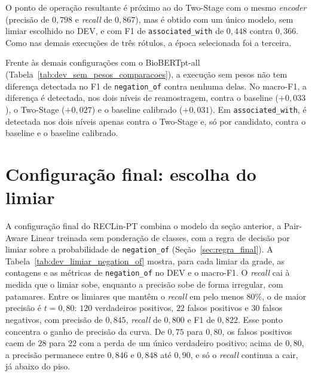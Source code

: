 O ponto de operação resultante é próximo ao do Two-Stage com o mesmo \emph{encoder}
(precisão de $0{,}798$ e \emph{recall} de $0{,}867$), mas é obtido com um único
modelo, sem limiar escolhido no DEV, e com F1 de \texttt{associated\_with} de
$0{,}448$ contra $0{,}366$. Como nas demais execuções de três rótulos, a época
selecionada foi a terceira.



Frente às demais configurações com o BioBERTpt-all
(Tabela~\ref{tab:dev_sem_pesos_comparacoes}), a execução sem pesos não tem diferença
detectada no F1 de \texttt{negation\_of} contra nenhuma delas. No macro-F1, a
diferença é detectada, nos dois níveis de reamostragem, contra o baseline
($+0{,}033$), o Two-Stage ($+0{,}027$) e o baseline calibrado ($+0{,}031$). Em
\texttt{associated\_with}, é detectada nos dois níveis apenas contra o Two-Stage e,
só por candidato, contra o baseline e o baseline calibrado.

\section{Configuração final: escolha do limiar}
\label{sec:resultados_configuracao_final}

A configuração final do RECLin-PT combina o modelo da seção anterior, a Pair-Aware
Linear treinada sem ponderação de classes, com a regra de decisão por limiar sobre
a probabilidade de \texttt{negation\_of} (Seção~\ref{sec:regra_final}). A
Tabela~\ref{tab:dev_limiar_negation_of} mostra, para cada limiar da grade, as
contagens e as métricas de \texttt{negation\_of} no DEV e o macro-F1. O
\emph{recall} cai à medida que o limiar sobe, enquanto a precisão sobe de forma
irregular, com patamares. Entre os limiares que mantêm o \emph{recall} em pelo menos
$80\%$, o de maior precisão é $t=0{,}80$: $120$ verdadeiros positivos, $22$ falsos
positivos e $30$ falsos negativos, com precisão de $0{,}845$, \emph{recall} de
$0{,}800$ e F1 de $0{,}822$. Esse ponto concentra o ganho de precisão da curva. De
$0{,}75$ para $0{,}80$, os falsos positivos caem de $28$ para $22$ com a perda de um
único verdadeiro positivo; acima de $0{,}80$, a precisão permanece entre $0{,}846$
e $0{,}848$ até $0{,}90$, e só o \emph{recall} continua a cair, já abaixo do piso.




